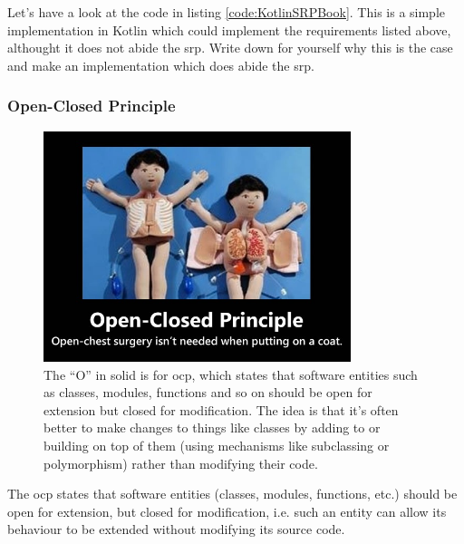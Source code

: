 \begin{exercise}
	Let's have a look at the code in listing \ref{code:KotlinSRPBook}. This is a simple implementation in Kotlin which could implement the requirements listed above, althought it does not abide the \gls{srp}. Write down for yourself why this is the case and make an implementation which does abide the \gls{srp}.
\end{exercise}



\subsubsection{Open-Closed Principle}

\begin{figure}
	\centering
	\includegraphics[width=0.8\textwidth]{images/kotlin/OCP.jpg}
	\caption{The “O” in \gls{solid} is for \gls{ocp}, which states that software entities such as classes, modules, functions and so on should be open for extension but closed for modification. The idea is that it’s often better to make changes to things like classes by adding to or building on top of them (using mechanisms like subclassing or polymorphism) rather than modifying their code.}
	\label{fir:OCP}
\end{figure}


\begin{framed}
	The \gls{ocp} states that software entities (classes, modules, functions, etc.) should be open for extension, but closed for modification, i.e.  such an entity can allow its behaviour to be extended without modifying its source code.
\end{framed}

